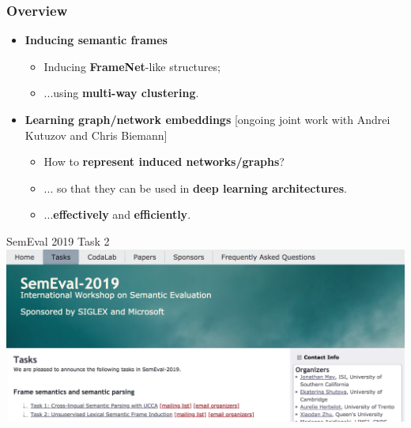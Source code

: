 \begin{frame}
  \frametitle{Overview}

  \begin{itemize}
  
  		
  		\pause 	
  		\vspace{10pt}
  
		\item \alert{\textbf{Inducing semantic frames}} \cite{ustalov2018unsupervised} 
		\begin{itemize}
			\item Inducing \textbf{FrameNet}-like structures;
			\item ...using \textbf{multi-way clustering}.
		\end{itemize}
		
		\pause 
		\vspace{10pt} 
		
		\item \alert{\textbf{Learning graph/network embeddings}} [ongoing joint work with Andrei Kutuzov and Chris Biemann]
		\begin{itemize}
		\item How to \textbf{represent induced networks/graphs}?
		\item ... so that they can be used in \textbf{deep learning architectures}.
		\item ...\textbf{effectively} and \textbf{efficiently}.
		\end{itemize}
			
	
			
\end{itemize}
	
\end{frame}


\begin{frame}{SemEval 2019 Task 2}
	\includegraphics[width=\textwidth]{figures/semeval}
\end{frame}



